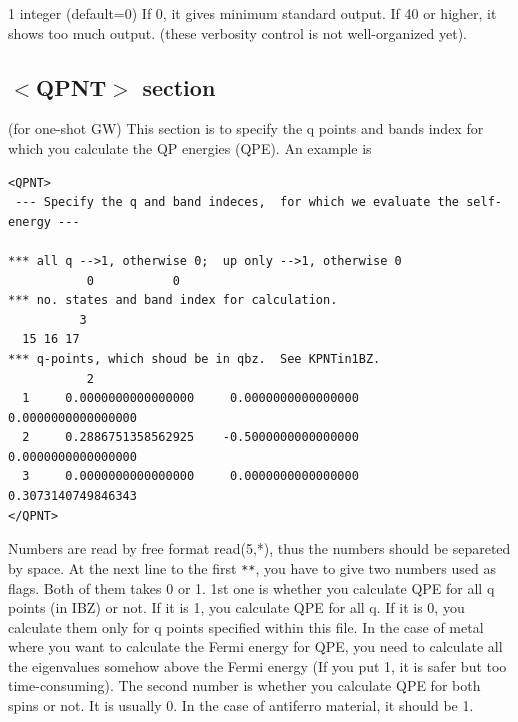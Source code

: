 \documentclass[a4paper,10pt,epsf,fleqn]{article}
\newcommand{\fx}[1]{\subsection{\sf #1\index{\sf #1}}}
\newcommand{\keyw}[1]{\fbox{\tt #1}}
\begin{document}
{\begin{enumerate}
\keyw{Verbose} 1 integer (default=0)
If 0, it gives minimum standard output.
If 40 or higher, it shows too much output.
(these verbosity control is not well-organized yet). 




\end{enumerate}


\fx{$<$QPNT$>$ section} 
(for one-shot GW)
This section is to specify the q points and bands index for which you calculate 
the QP energies (QPE). An example is
{\baselineskip=2.6mm
\begin{verbatim}
<QPNT>
 --- Specify the q and band indeces,  for which we evaluate the self-energy ---

*** all q -->1, otherwise 0;  up only -->1, otherwise 0
           0           0
*** no. states and band index for calculation.
          3
  15 16 17 
*** q-points, which shoud be in qbz.  See KPNTin1BZ.
           2
  1     0.0000000000000000     0.0000000000000000     0.0000000000000000
  2     0.2886751358562925    -0.5000000000000000     0.0000000000000000
  3     0.0000000000000000     0.0000000000000000     0.3073140749846343
</QPNT>
\end{verbatim}}
Numbers are read by free format read(5,*), 
thus the numbers should be separeted by space.
At the next line to the first {\tt ***},
you have to give two numbers used as flags. 
Both of them takes 0 or 1.
1st one is whether you calculate QPE for all q points (in IBZ) or not.
If it is 1, you calculate  QPE for all q. If it is 0, you calculate them only for
q points specified within this file. In the case of metal where you want to calculate the Fermi energy for QPE,
you need to calculate all the eigenvalues somehow above the Fermi energy
(If you put 1, it is safer but too time-consuming).
The second number is whether you calculate QPE for
both spins or not. 
It is usually 0. In the case of antiferro material, 
it should be 1.

}
\end{document}
